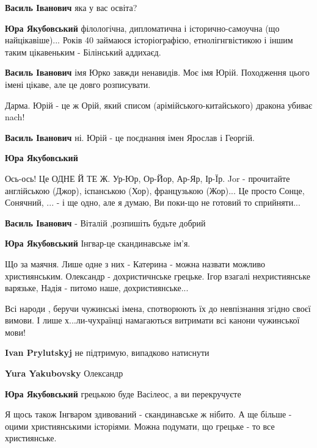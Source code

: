 \begin{itemize}
\begin{itemize}
\textbf{Василь Іванович} яка у вас освіта?

\textbf{Юра Якубовський} філологічна, дипломатична і історично-самоучна (що найцікавіше)... Років 40 займаюся історіографією, етнолігнгвістикою і іншим таким цікавеньким - Білінський аддихаєд.

\textbf{Василь Іванович} імя Юрко завжди ненавидів. Моє імя Юрій. Походження цього імені цікаве, але це довго розписувати.

Дарма. Юрій - це ж Орій, який списом (арімійського-китайського) дракона убиває nach!

\textbf{Василь Іванович} ні. Юрій - це поєднання імен Ярослав і Георгій.

\textbf{Юра Якубовський} 

Ось-ось! Це ОДНЕ Й ТЕ Ж. Ур-Юр, Ор-Йор, Ар-Яр, Ір-Їр. Jor - прочитайте
англійською (Джор), іспанською (Хор), французькою (Жор)... Це просто Сонце,
Сонячний, ... - і ще одно, але я думаю, Ви поки-що не готовий то сприйняти...

\textbf{Василь Іванович} - Віталій ,розпишіть будьте добрий

\textbf{Юра Якубовський} Інгвар-це скандинавське ім'я.


Що за маячня. Лише одне з них - Катерина - можна назвати можливо християнським.
Олександр - дохристичнське грецьке. Ігор взагалі нехристиянське варязьке, Надія
- питомо наше, дохристиянське...



Всі народи , беручи чужинські імена, спотворюють їх до невпізнання згідно своєї
вимови. І лише х...ли-чухраїнці намагаються витримати всі канони чужинської
мови!

\textbf{Ivan Prylutskyj} не підтримую, випадково натиснути

\textbf{Yura Yakubovsky} Олександр

\textbf{Юра Якубовський} грецькою буде Васілеос, а ви перекручуєте


Я щось також Інгваром здивований - скандинавське ж нібито. А ще більше - оцими
християнськими історіями. Можна подумати, що грецьке - то все християнське.


\end{itemize}
\end{itemize}
